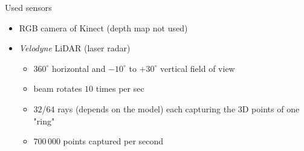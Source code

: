 \documentclass[pdf]{beamer}
\begin{document}
	\begin{frame}{Used sensors}
		\begin{itemize}
			\item RGB camera of Kinect (depth map not used)
			\item \emph{Velodyne} LiDAR (laser radar)
			\begin{itemize}
				\item $360^{\circ}$ horizontal and $-10^{\circ}$ to $+30^{\circ}$ vertical field of view
				\item beam rotates $10$ times per sec 				
				\item $32$/$64$ rays (depends on the model) each capturing the $3$D points of one "ring"
				\item $700\,000$ points captured per second
			\end{itemize}
		\end{itemize}	
		\begin{figure}[h]
			\center
			\quad
			\quad
		\end{figure}
	\end{frame}
	
\end{document}
